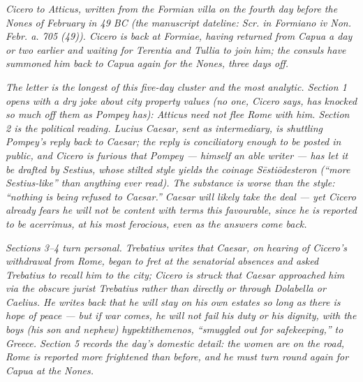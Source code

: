 
\textit{Cicero to Atticus, written from the Formian villa
on the fourth day before the Nones of February in 49 BC
(the manuscript dateline: \textit{Scr. in Formiano iv
Non. Febr. a. 705 (49)}). Cicero is back at Formiae,
having returned from Capua a day or two earlier and
waiting for Terentia and Tullia to join him; the consuls
have summoned him back to Capua again for the Nones,
three days off.}

\textit{The letter is the longest of this five-day cluster
and the most analytic. Section 1 opens with a dry joke
about city property values (no one, Cicero says, has
knocked so much off them as Pompey has): Atticus need not
flee Rome with him. Section 2 is the political reading.
Lucius Caesar, sent as intermediary, is shuttling
Pompey's reply back to Caesar; the reply is conciliatory
enough to be posted in public, and Cicero is furious that
Pompey --- himself an able writer --- has let it be drafted
by Sestius, whose stilted style yields the coinage
\emph{Sēstiōdesteron} (``more Sestius-like'' than
anything ever read). The substance is worse than the
style: ``nothing is being refused to Caesar.'' Caesar
will likely take the deal --- yet Cicero already fears he
will not be content with terms this favourable, since he
is reported to be \emph{acerrimus}, at his most ferocious,
even as the answers come back.}

\textit{Sections 3--4 turn personal. Trebatius writes that
Caesar, on hearing of Cicero's withdrawal from Rome,
began to fret at the senatorial absences and asked
Trebatius to recall him to the city; Cicero is struck
that Caesar approached him via the obscure jurist
Trebatius rather than directly or through Dolabella or
Caelius. He writes back that he will stay on his own
estates so long as there is hope of peace --- but if war
comes, he will not fail his duty or his dignity, with the
boys (his son and nephew) \emph{hypektithemenos},
``smuggled out for safekeeping,'' to Greece. Section 5
records the day's domestic detail: the women are on the
road, Rome is reported more frightened than before, and
he must turn round again for Capua at the Nones.}

